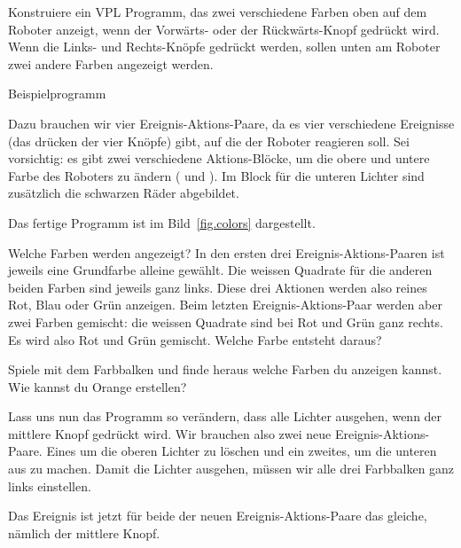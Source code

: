
Konstruiere ein VPL Programm, das zwei verschiedene Farben oben auf dem Roboter
anzeigt, wenn der Vorwärts- oder der Rückwärts-Knopf gedrückt wird. Wenn die
Links- und Rechts-Knöpfe gedrückt werden, sollen unten am Roboter zwei andere
Farben angezeigt werden.

{\raggedleft \hfill Beispielprogramm }

Dazu brauchen wir vier Ereignis-Aktions-Paare, da es vier verschiedene
Ereignisse (das drücken der vier Knöpfe) gibt, auf die der Roboter reagieren
soll. Sei vorsichtig: es gibt zwei verschiedene Aktions-Blöcke, um die obere
und untere Farbe des Roboters zu ändern ( und
). Im Block für die unteren Lichter sind zusätzlich die
schwarzen Räder abgebildet.

Das fertige Programm ist im Bild~\ref{fig.colors} dargestellt.

Welche Farben werden angezeigt? In den ersten drei Ereignis-Aktions-Paaren ist
jeweils eine Grundfarbe alleine gewählt. Die weissen Quadrate für die anderen
beiden Farben sind jeweils ganz links. Diese drei Aktionen werden also reines
Rot, Blau oder Grün anzeigen. Beim letzten Ereignis-Aktions-Paar werden aber
zwei Farben gemischt: die weissen Quadrate sind bei Rot und Grün ganz rechts.
Es wird also Rot und Grün gemischt. Welche Farbe entsteht daraus?


Spiele mit dem Farbbalken und finde heraus welche Farben du anzeigen kannst.
Wie kannst du Orange erstellen?


Lass uns nun das Programm so verändern, dass alle Lichter ausgehen, wenn der
mittlere Knopf gedrückt wird. Wir brauchen also zwei neue
Ereignis-Aktions-Paare. Eines um die oberen Lichter zu löschen und ein zweites,
um die unteren aus zu machen. Damit die Lichter ausgehen, müssen wir alle drei
Farbbalken ganz links einstellen.

Das Ereignis ist jetzt für beide der neuen Ereignis-Aktions-Paare das gleiche,
nämlich der mittlere Knopf.


